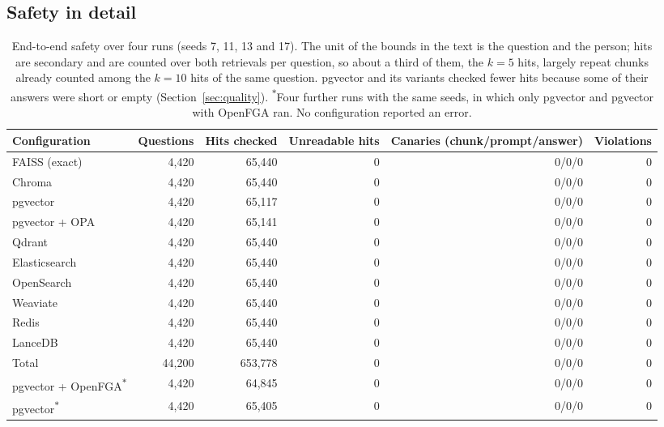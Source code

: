 \subsection{Safety in detail}\label{app:e2e-safety}

\begin{table}[tbp]
\centering
\footnotesize\setlength{\tabcolsep}{4pt}
\begin{tabular}{@{}lrrrrr@{}}
\toprule
Configuration & Questions & Hits checked & Unreadable hits & Canaries (chunk/prompt/answer) & Violations \\
\midrule
FAISS (exact) & 4,420 & 65,440 & 0 & 0/0/0 & 0 \\
Chroma & 4,420 & 65,440 & 0 & 0/0/0 & 0 \\
pgvector & 4,420 & 65,117 & 0 & 0/0/0 & 0 \\
pgvector + OPA & 4,420 & 65,141 & 0 & 0/0/0 & 0 \\
Qdrant & 4,420 & 65,440 & 0 & 0/0/0 & 0 \\
Elasticsearch & 4,420 & 65,440 & 0 & 0/0/0 & 0 \\
OpenSearch & 4,420 & 65,440 & 0 & 0/0/0 & 0 \\
Weaviate & 4,420 & 65,440 & 0 & 0/0/0 & 0 \\
Redis & 4,420 & 65,440 & 0 & 0/0/0 & 0 \\
LanceDB & 4,420 & 65,440 & 0 & 0/0/0 & 0 \\
\midrule
Total & 44,200 & 653,778 & 0 & 0/0/0 & 0 \\
\midrule
pgvector + OpenFGA\textsuperscript{$\ast$} & 4,420 & 64,845 & 0 & 0/0/0 & 0 \\
pgvector\textsuperscript{$\ast$} & 4,420 & 65,405 & 0 & 0/0/0 & 0 \\
\bottomrule
\end{tabular}
\caption{End-to-end safety over four runs (seeds 7, 11, 13 and 17). The unit of the bounds in the
text is the question and the person; hits are secondary and are counted over both retrievals per
question, so about a third of them, the $k = 5$ hits, largely repeat chunks already counted among the
$k = 10$ hits of the same question. pgvector and its variants checked fewer hits because some of
their answers were short or empty (Section~\ref{sec:quality}). \textsuperscript{$\ast$}Four further
runs with the same seeds, in which only pgvector and pgvector with OpenFGA ran. No configuration
reported an error.}
\label{tab:e2e-safety}
\end{table}

